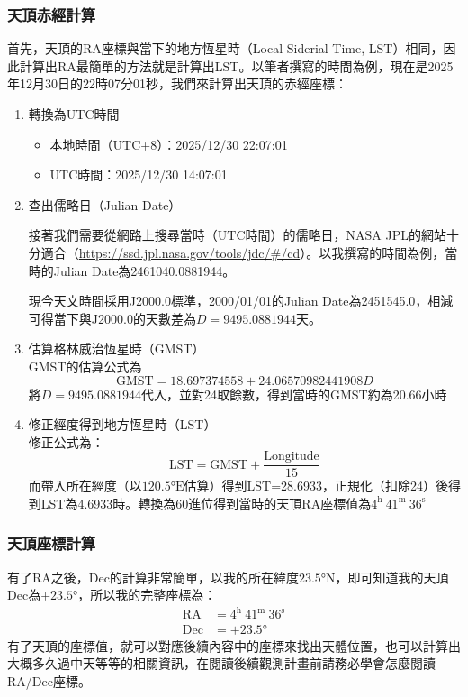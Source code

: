 \subsubsection{天頂赤經計算}
首先，天頂的RA座標與當下的地方恆星時（Local Siderial Time, LST）相同，因此計算出RA最簡單的方法就是計算出LST。以筆者撰寫的時間為例，現在是2025年12月30日的22時07分01秒，我們來計算出天頂的赤經座標：
\begin{enumerate}
    \item 轉換為UTC時間
        \begin{itemize}
            \item 本地時間（UTC+8）：2025/12/30 22:07:01
            \item UTC時間：2025/12/30 14:07:01
        \end{itemize}
    \item 查出儒略日（Julian Date）\par
        接著我們需要從網路上搜尋當時（UTC時間）的儒略日，NASA JPL的網站十分適合（\url{https://ssd.jpl.nasa.gov/tools/jdc/#/cd}）。以我撰寫的時間為例，當時的Julian Date為2461040.0881944。\par
        現今天文時間採用J2000.0標準，2000/01/01的Julian Date為2451545.0，相減可得當下與J2000.0的天數差為\(D=9495.0881944\)天。
    \item 估算格林威治恆星時（GMST）\\
        GMST的估算公式為\[\text{GMST}=18.697374558+24.06570982441908D\]
        將\(D=9495.0881944\)代入，並對24取餘數，得到當時的GMST約為20.66小時
    \item 修正經度得到地方恆星時（LST）\\
        修正公式為：\[\text{LST}=\text{GMST}+\frac{\text{Longitude}}{15}\]
        而帶入所在經度（以\(\ang{120.5;;}\text{E}\)估算）得到LST=28.6933，正規化（扣除24）後得到LST為4.6933時。轉換為60進位得到當時的天頂RA座標值為\textbf{\(4^\text{h }41^\text{m }36^\text{s}\)}
\end{enumerate}
\subsubsection{天頂座標計算}
有了RA之後，Dec的計算非常簡單，以我的所在緯度\(\ang{23.5;;}\text{N}\)，即可知道我的天頂Dec為\(+\ang{23.5;;}\)，所以我的完整座標為：
\begin{align*}
    \text{RA}&=4^\text{h }41^\text{m }36^\text{s}\\
    \text{Dec}&=+\ang{23.5;;}
\end{align*}
有了天頂的座標值，就可以對應後續內容中的座標來找出天體位置，也可以計算出大概多久過中天等等的相關資訊，在閱讀後續觀測計畫前請務必學會怎麼閱讀RA/Dec座標。

